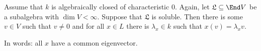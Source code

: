 Assume that $k$ is algebraically closed of characteristic $0$.
Again, let $\mathfrak{L} \subseteq \End V$ be a subalgebra with $\dim V<\infty$.
Suppose that $\mathfrak{L}$ is soluble. Then there is some $v \in V$ such that
$v\neq 0$ and for all $x \in L$ there is $\lambda_x \in k$ such that
$x(v) = \lambda_x v$.

In words: all $x$ have a common eigenvector.
